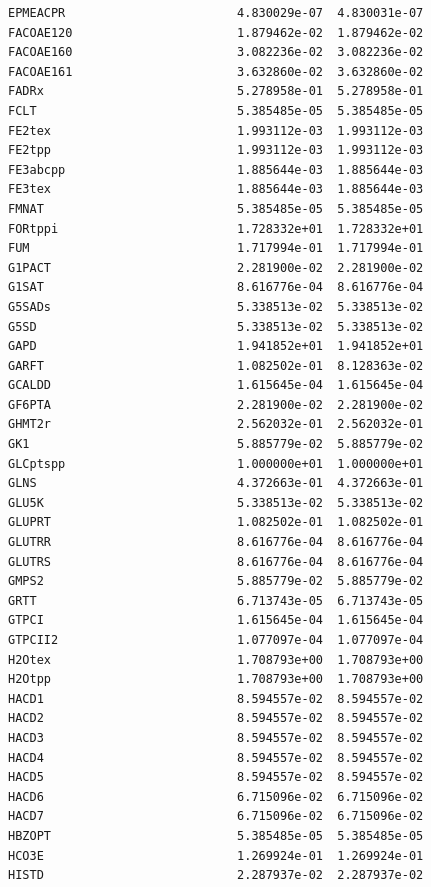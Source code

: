 \documentclass{scrartcl}
\begin{document}
\begin{enumerate}
\begin{lstlisting}
EPMEACPR                        4.830029e-07  4.830031e-07
FACOAE120                       1.879462e-02  1.879462e-02
FACOAE160                       3.082236e-02  3.082236e-02
FACOAE161                       3.632860e-02  3.632860e-02
FADRx                           5.278958e-01  5.278958e-01
FCLT                            5.385485e-05  5.385485e-05
FE2tex                          1.993112e-03  1.993112e-03
FE2tpp                          1.993112e-03  1.993112e-03
FE3abcpp                        1.885644e-03  1.885644e-03
FE3tex                          1.885644e-03  1.885644e-03
FMNAT                           5.385485e-05  5.385485e-05
FORtppi                         1.728332e+01  1.728332e+01
FUM                             1.717994e-01  1.717994e-01
G1PACT                          2.281900e-02  2.281900e-02
G1SAT                           8.616776e-04  8.616776e-04
G5SADs                          5.338513e-02  5.338513e-02
G5SD                            5.338513e-02  5.338513e-02
GAPD                            1.941852e+01  1.941852e+01
GARFT                           1.082502e-01  8.128363e-02
GCALDD                          1.615645e-04  1.615645e-04
GF6PTA                          2.281900e-02  2.281900e-02
GHMT2r                          2.562032e-01  2.562032e-01
GK1                             5.885779e-02  5.885779e-02
GLCptspp                        1.000000e+01  1.000000e+01
GLNS                            4.372663e-01  4.372663e-01
GLU5K                           5.338513e-02  5.338513e-02
GLUPRT                          1.082502e-01  1.082502e-01
GLUTRR                          8.616776e-04  8.616776e-04
GLUTRS                          8.616776e-04  8.616776e-04
GMPS2                           5.885779e-02  5.885779e-02
GRTT                            6.713743e-05  6.713743e-05
GTPCI                           1.615645e-04  1.615645e-04
GTPCII2                         1.077097e-04  1.077097e-04
H2Otex                          1.708793e+00  1.708793e+00
H2Otpp                          1.708793e+00  1.708793e+00
HACD1                           8.594557e-02  8.594557e-02
HACD2                           8.594557e-02  8.594557e-02
HACD3                           8.594557e-02  8.594557e-02
HACD4                           8.594557e-02  8.594557e-02
HACD5                           8.594557e-02  8.594557e-02
HACD6                           6.715096e-02  6.715096e-02
HACD7                           6.715096e-02  6.715096e-02
HBZOPT                          5.385485e-05  5.385485e-05
HCO3E                           1.269924e-01  1.269924e-01
HISTD                           2.287937e-02  2.287937e-02

\end{lstlisting}
\end{enumerate}
\end{document}

